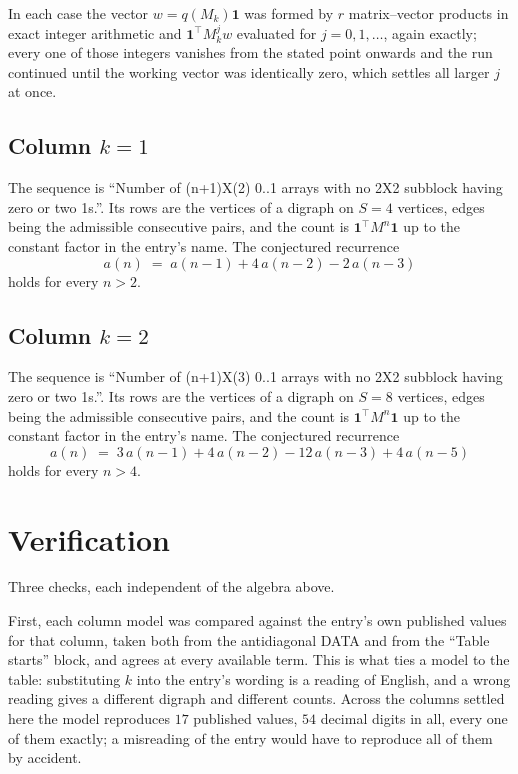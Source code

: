 \documentclass[11pt,a4paper]{article}
\theoremstyle{plain}
\theoremstyle{definition}
\begin{document}
In each case the vector $w=q(M_k)\mathbf{1}$ was formed by $r$ matrix--vector products in
exact integer arithmetic and $\mathbf{1}^{\!\top}M_k^{j}w$ evaluated for $j=0,1,\dots$,
again exactly; every one of those integers vanishes from the stated point onwards and the run
continued until the working vector was identically zero, which settles all larger $j$ at once.

\subsection*{Column $k=1$}
The sequence is ``Number of (n+1)X(2) 0..1 arrays with no 2X2 subblock having zero or two 1s.''. Its rows are the vertices of a digraph on
$S=4$ vertices, edges being the admissible consecutive pairs, and the count is
$\mathbf{1}^{\!\top}M^{n}\mathbf{1}$ up to the constant factor in the entry's name.
The conjectured recurrence
\[
a(n)\;=\;a(n-1) + 4\,a(n-2) - 2\,a(n-3)
\]
holds for every $n>2$.

\subsection*{Column $k=2$}
The sequence is ``Number of (n+1)X(3) 0..1 arrays with no 2X2 subblock having zero or two 1s.''. Its rows are the vertices of a digraph on
$S=8$ vertices, edges being the admissible consecutive pairs, and the count is
$\mathbf{1}^{\!\top}M^{n}\mathbf{1}$ up to the constant factor in the entry's name.
The conjectured recurrence
\[
a(n)\;=\;3\,a(n-1) + 4\,a(n-2) - 12\,a(n-3) + 4\,a(n-5)
\]
holds for every $n>4$.

\section{Verification}

Three checks, each independent of the algebra above.

First, each column model was compared against the entry's own published values for that
column, taken both from the antidiagonal DATA and from the ``Table starts'' block, and agrees
at every available term. This is what ties a model to the table: substituting $k$ into the
entry's wording is a reading of English, and a wrong reading gives a different digraph and
different counts. Across the columns settled here the model reproduces $17$ published
values, $54$ decimal digits in all, every one of them exactly; a misreading of the entry
would have to reproduce all of them by accident.
\end{document}
